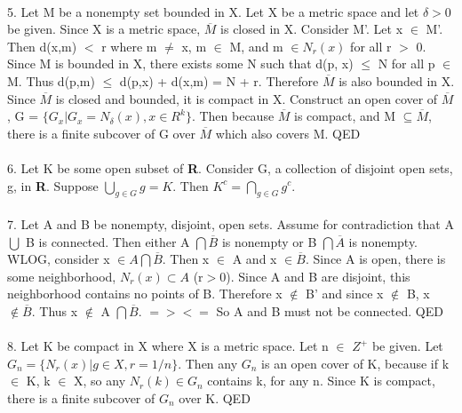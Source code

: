 \documentclass{article}
\begin{document}
\\
5.  Let M be a nonempty set bounded in X.  Let X be a metric space and let $\delta > 0$ be given.  Since X is a metric space, $\overline{M}$ is closed in X.  Consider M'.  Let x $\in$ M'.  Then d(x,m) $<$ r where m $\neq$ x, m $\in$ M, and m $\in N_{r}(x)$ for all r $>$ 0.  Since M is bounded in X, there exists some N such that d(p, x) $\leq$ N for all p $\in$ M.  Thus d(p,m) $\leq$ d(p,x) + d(x,m) = N + r.  Therefore $\overline{M}$ is also bounded in X.  Since $\overline{M}$ is closed and bounded, it is compact in X.  Construct an open cover of $\overline{M}$, G = $\lbrace G_{x} | G_{x} = N_{\delta}(x), x \in R^{k} \rbrace$.  Then because $\overline{M}$ is compact, and M $\subseteq \overline{M}$, there is a finite subcover of G over $\overline{M}$ which also covers M.  QED   \\
\\
6.  Let K be some open subset of \textbf{R}.  Consider G, a collection of disjoint open sets, g, in \textbf{R}.  Suppose $\bigcup_{g \in G} g = K$.  Then $K^{c} = \bigcap_{g \in G} g^{c}$.  \\
\\
7.  Let A and B be nonempty, disjoint, open sets.  Assume for contradiction that A $\bigcup$ B is connected.  Then either A $\bigcap \overline{B}$ is nonempty or B $\bigcap \overline{A}$ is nonempty.  WLOG, consider x $\in A \bigcap \overline{B}$.  Then x $\in$ A and x $\in \overline{B}$.  Since A is open, there is some neighborhood, $N_{r}(x) \subset A$ (r$>$0).  Since A and B are disjoint, this neighborhood contains no points of B.  Therefore x $\notin$ B' and since x $\notin$ B, x $\notin \overline{B}$.  Thus x $\notin$ A $\bigcap \overline{B}$.  $=><=$  So A and B must not be connected.  QED\\
\\
8.  Let K be compact in X where X is a metric space.  Let n $\in$ \textbf{$Z^{+}$} be given.  Let $G_{n} = \lbrace N_{r}(x) | g \in X, r = 1/n \rbrace$.  Then any $G_{n}$ is an open cover of K, because if k $\in$ K, k $\in$ X, so any $N_{r}(k) \in G_{n}$ contains k, for any n.  Since K is compact, there is a finite subcover of $G_{n}$ over K.  QED \\
\\
\end{document}

